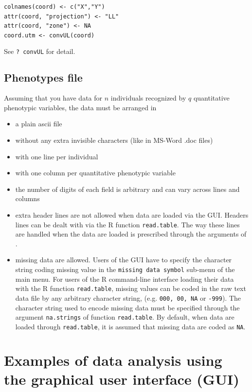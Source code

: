 \documentclass{article}
\begin{document}
\begin{verbatim}
colnames(coord) <- c("X","Y")
attr(coord, "projection") <- "LL"
attr(coord, "zone") <- NA 
coord.utm <- convUL(coord)
\end{verbatim}

See {\tt ? convUL} for detail.


\subsection{Phenotypes file}


Assuming that you have data for $n$  individuals recognized by $q$ quantitative 
phenotypic variables, the data must be arranged in 
\begin{itemize}
\item a plain ascii file 
\item without any extra invisible characters (like in MS-Word .doc files)
\item with one line per individual
\item with one column per  quantitative phenotypic variable
\item the number of digits of each field is arbitrary and can vary across lines and columns
\item extra header lines are not allowed when data are loaded via the GUI. 
Headers lines can be dealt with via the R function \texttt{read.table}. 
 The way these lines are handled when the data are loaded is prescribed 
through the arguments of .
\item missing data  are allowed. 
Users of the GUI have to specify the character string coding missing value in the \texttt{missing data symbol} sub-menu 
of the main menu. 
For users of the R command-line interface loading their data with the R function \texttt{read.table}, 
missing values can be coded in the raw text data file by any arbitrary character string, 
(e.g. {\tt000, 00, NA} or {\tt -999}). 
The character string used to encode missing data must be specified through the argument \texttt{na.strings} 
of function \texttt{read.table}. By default, when data are loaded through \texttt{read.table}, 
it is assumed that missing data 
are coded as {\tt NA}.
\end{itemize}


\clearpage
\section[Examples with the GUI]{Examples of data analysis using the graphical user interface (GUI)}
\end{document}
